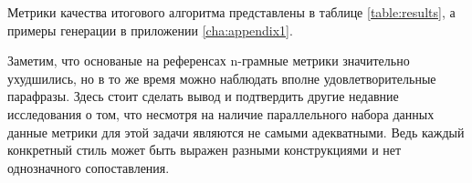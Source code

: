 Метрики качества итогового алгоритма представлены в таблице \ref{table:results}, а примеры генерации в приложении \ref{cha:appendix1}.



Заметим, что основаные на референсах n-грамные метрики значительно ухудшились, но в то же время можно наблюдать вполне удовлетворительные парафразы.
Здесь стоит сделать вывод и подтвердить другие недавние исследования \cite{li2018delete, mir2019evaluating, shen2022evaluation} о том, что несмотря на наличие параллельного набора данных данные метрики для этой задачи являются не самыми адекватными.
Ведь каждый конкретный стиль может быть выражен разными конструкциями и нет однозначного сопоставления.



